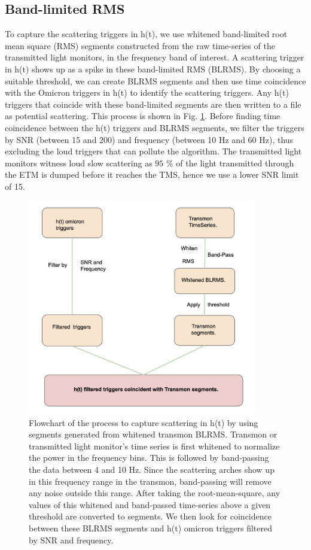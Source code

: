 \documentclass[12pt]{iopart}
\begin{document}
\subsection{Band-limited RMS}
To capture the scattering triggers in h(t), we use whitened band-limited root mean square (RMS) segments constructed from the raw time-series of the transmitted light monitors, in the frequency band of interest. A scattering trigger in h(t) shows up as a spike in these band-limited RMS (BLRMS). By choosing a suitable threshold, we can create BLRMS segments and then use time coincidence with the Omicron triggers in h(t) to identify the scattering triggers. Any h(t) triggers that coincide with these band-limited segments are then written to a file as potential scattering.  This process is shown in Fig. \ref{fig:flow}. Before finding time coincidence between the h(t) triggers and BLRMS segments, we filter the triggers by SNR (between 15 and 200) and frequency (between 10 Hz and 60 Hz), thus excluding the loud triggers that can pollute the algorithm. The transmitted light monitors witness loud slow scattering as $95$ \% of the light transmitted through the ETM is dumped before it reaches the TMS, hence we use a lower SNR limit of 15.

\quad
\begin{figure}[h]
    \centering
    \includegraphics[width=10cm]{flow.png}
    \caption{Flowchart of the process to capture scattering in h(t) by using segments generated from whitened transmon BLRMS. Transmon or transmitted light monitor's time series is first whitened to normalize the power in the frequency bins. This is followed by band-passing the data between 4 and 10 Hz. Since the scattering arches show up in this frequency range in the transmon, band-passing will remove any noise outside this range. After taking the root-mean-square, any values of this whitened and band-passed time-series above a given threshold are converted to segments. We then look for coincidence between these BLRMS segments and h(t) omicron triggers filtered by SNR and frequency.}
    \label{fig:flow}
\end{figure}
\end{document}

